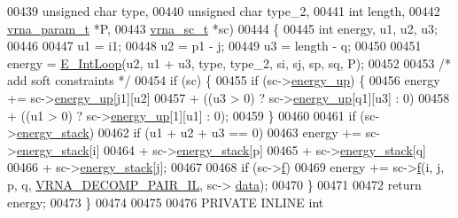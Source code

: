 \begin{DoxyCode}
00439                       \textcolor{keywordtype}{unsigned} \textcolor{keywordtype}{char} type,
00440                       \textcolor{keywordtype}{unsigned} \textcolor{keywordtype}{char} type\_2,
00441                       \textcolor{keywordtype}{int}           length,
00442                       \hyperlink{group__energy__parameters_structvrna__param__s}{vrna\_param\_t}  *P,
00443                       \hyperlink{group__soft__constraints_structvrna__sc__s}{vrna\_sc\_t}     *sc)
00444 \{
00445   \textcolor{keywordtype}{int} energy, u1, u2, u3;
00446 
00447   u1  = i1;
00448   u2  = p1 - j;
00449   u3  = length - q;
00450 
00451   energy = \hyperlink{group__eval__deprecated_gaafbc187b7f78e8e82afb77dd6f3b8fc5}{E\_IntLoop}(u2, u1 + u3, type, type\_2, si, sj, sp, sq, P);
00452 
00453   \textcolor{comment}{/* add soft constraints */}
00454   \textcolor{keywordflow}{if} (sc) \{
00455     \textcolor{keywordflow}{if} (sc->\hyperlink{group__soft__constraints_a57e4dbb924ab11f304e3762a3a9b07a1}{energy\_up}) \{
00456       energy += sc->\hyperlink{group__soft__constraints_a57e4dbb924ab11f304e3762a3a9b07a1}{energy\_up}[j1][u2]
00457                 + ((u3 > 0) ? sc->\hyperlink{group__soft__constraints_a57e4dbb924ab11f304e3762a3a9b07a1}{energy\_up}[q1][u3] : 0)
00458                 + ((u1 > 0) ? sc->\hyperlink{group__soft__constraints_a57e4dbb924ab11f304e3762a3a9b07a1}{energy\_up}[1][u1] : 0);
00459     \}
00460 
00461     \textcolor{keywordflow}{if} (sc->\hyperlink{group__soft__constraints_ac20dded6068e81acd0f1139092f66a22}{energy\_stack})
00462       \textcolor{keywordflow}{if} (u1 + u2 + u3 == 0)
00463         energy += sc->\hyperlink{group__soft__constraints_ac20dded6068e81acd0f1139092f66a22}{energy\_stack}[i]
00464                   + sc->\hyperlink{group__soft__constraints_ac20dded6068e81acd0f1139092f66a22}{energy\_stack}[p]
00465                   + sc->\hyperlink{group__soft__constraints_ac20dded6068e81acd0f1139092f66a22}{energy\_stack}[q]
00466                   + sc->\hyperlink{group__soft__constraints_ac20dded6068e81acd0f1139092f66a22}{energy\_stack}[j];
00467 
00468     \textcolor{keywordflow}{if} (sc->\hyperlink{group__soft__constraints_a32dc86090237888c75491bbd4861a04b}{f})
00469       energy += sc->\hyperlink{group__soft__constraints_a32dc86090237888c75491bbd4861a04b}{f}(i, j, p, q, \hyperlink{group__constraints_gaeab04f34d7730cff2d651d782f95d857}{VRNA\_DECOMP\_PAIR\_IL}, sc->
      \hyperlink{group__soft__constraints_a7574680143df97b9029146c2150bf06d}{data});
00470   \}
00471 
00472   \textcolor{keywordflow}{return} energy;
00473 \}
00474 
00475 
00476 PRIVATE INLINE \textcolor{keywordtype}{int}

\end{DoxyCode}
